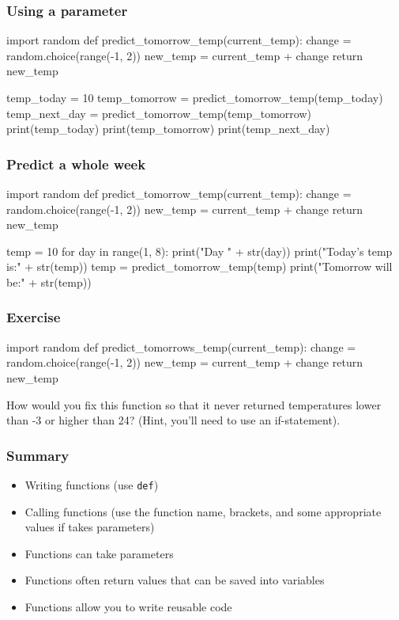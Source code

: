 \documentclass{beamer}
\begin{document}
\begin{frame}[fragile]
\frametitle{Using a parameter}
\begin{shaded}
\begin{code}
import random
def predict_tomorrow_temp(current_temp):
   change = random.choice(range(-1, 2))
   new_temp = current_temp + change
   return new_temp

temp_today = 10
temp_tomorrow = predict_tomorrow_temp(temp_today)
temp_next_day = predict_tomorrow_temp(temp_tomorrow)
print(temp_today)
print(temp_tomorrow)
print(temp_next_day)
\end{code}
\end{shaded}
\end{frame}

\begin{frame}[fragile]
\frametitle{Predict a whole week}
\begin{shaded}
\begin{code}
import random
def predict_tomorrow_temp(current_temp):
   change = random.choice(range(-1, 2))
   new_temp = current_temp + change
   return new_temp

temp = 10
for day in range(1, 8):
   print("Day " + str(day))
   print("Today's temp is:" + str(temp))
   temp = predict_tomorrow_temp(temp)
   print("Tomorrow will be:" + str(temp))
\end{code}
\end{shaded}
\end{frame}

\begin{frame}[fragile]
\frametitle{Exercise}
\begin{shaded}
\begin{code}
import random
def predict_tomorrows_temp(current_temp):
   change = random.choice(range(-1, 2))
   new_temp = current_temp + change
   return new_temp
\end{code}
\end{shaded}

How would you fix this function so that it never returned
temperatures lower than -3 or higher than 24? (Hint, you'll
need to use an if-statement).
\end{frame}

\begin{frame}
\frametitle{Summary}
\begin{itemize}
\item Writing functions (use \texttt{def})
\item Calling functions (use the function name, brackets, and some
  appropriate values if takes parameters)
\item Functions can take parameters
\item Functions often return values that can be saved into variables
\item Functions allow you to write reusable code
\end{itemize}
\end{frame}
\end{document}
